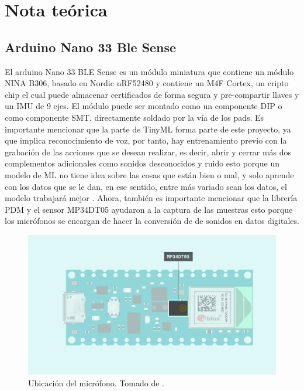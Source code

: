 \section{Nota teórica}
\subsection*{Arduino Nano 33 Ble Sense}
El arduino Nano 33 BLE Sense es un módulo miniatura que contiene un módulo NINA B306, basado en Nordic nRF52480 y contiene un M4F Cortex, un cripto chip el cual puede almacenar certificados de forma segura y pre-compartir llaves y un IMU de 9 ejes. El módulo puede ser montado como un componente DIP o como componente SMT, directamente soldado por la vía de los pads. Es importante mencionar que la parte de TinyML forma parte de este proyecto, ya que implica reconocimiento de voz, por tanto, hay entrenamiento previo con la grabación de las acciones que se desean realizar, es decir, abrir y cerrar más dos complementos adicionales como sonidos desconocidos y ruido esto porque un modelo de ML no tiene idea sobre las cosas que están bien o mal, y solo aprende con los datos que se le dan, en ese sentido, entre más variado sean los datos, el modelo trabajará mejor \cite{web5}. Ahora, también es importante mencionar que la librería PDM y el sensor MP34DT05 ayudaron a la captura de las muestras esto porque los micrófonos se encargan de hacer la conversión de de sonidos en datos digitales.
\begin{figure}[H]
\centering
\includegraphics[width=.55\linewidth]{Img/Nano33_ble_sense_microphone.png}
 \caption{Ubicación del micrófono. Tomado de \cite{web6}.}
 \label{fig_micro}
\end{figure}


